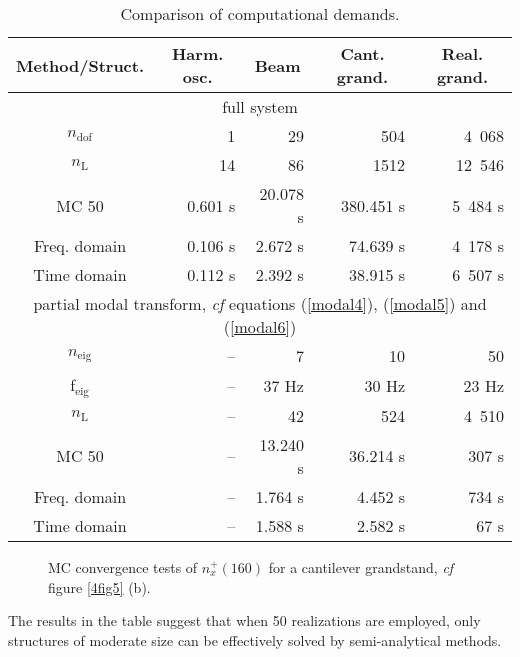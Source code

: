 \documentclass[preprint,12pt,authoryear]{elsarticle}
\begin{document}
\begin{table}
\centering
\caption{Comparison of computational demands.}
\begin{tabular}{|c|r|r|r|r|}\hline
	Method/Struct. & \multicolumn{1}{c|}{Harm. osc.} & \multicolumn{1}{c|}{Beam} & \multicolumn{1}{c|}{Cant. grand.} & \multicolumn{1}{c|}{Real. grand.} \\\hline
	\multicolumn{5}{|c|}{full system} \\\hline
  $n_{\mathrm{dof}}$ & 1 & 29 & 504 & 4\ 068 \\
	$n_\mathrm{L}$ & 14 & 86 & 1512 & 12\ 546 \\	
	MC 50 & 0.601 s & 20.078 s & 380.451 s & 5\ 484 s \\
	Freq. domain & 0.106 s & 2.672 s & 74.639 s & 4\ 178 s \\
	Time domain & 0.112 s & 2.392 s & 38.915 s & 6\ 507 s \\\hline
	\multicolumn{5}{|c|}{partial modal transform, \textit{cf} equations (\ref{modal4}), (\ref{modal5}) and (\ref{modal6})} \\\hline
	$n_{\mathrm{eig}}$ & -- & 7 & 10 & 50 \\
	f$_{\mathrm{eig}}$ & -- & $37$ Hz & $30$ Hz & $23$ Hz \\
	$n_\mathrm{L}$ & -- & 42 & 524 & 4\ 510 \\
	MC 50 & -- & 13.240 s & 36.214 s & 307 s \\
	Freq. domain & -- & 1.764 s & 4.452 s & 734 s \\
	Time domain & -- & 1.588 s & 2.582 s & 67 s \\\hline
\end{tabular}
\label{4tab2}
\end{table}
\begin{figure}
	\centering
	\caption{MC convergence tests of $n_x^+(160)$ for a cantilever grandstand, \textit{cf} figure \ref{4fig5} (b).}
\label{4fig7}
\end{figure}
The results in the table suggest that when 50 realizations are employed, only structures of moderate size can be effectively solved by semi-analytical methods.
\end{document}
